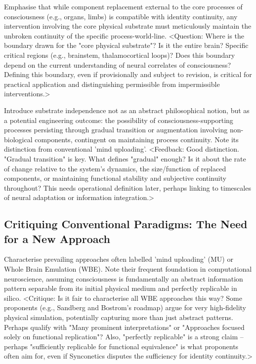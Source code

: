 \documentclass[10pt]{article}
\begin{document}
\begin{sloppypar}
  Emphasise that while component replacement external to the core processes of consciousness (e.g., organs, limbs) is compatible with identity continuity, any intervention involving the core physical substrate must meticulously maintain the unbroken continuity of the specific process-world-line. <Question: Where is the boundary drawn for the "core physical substrate"? Is it the entire brain? Specific critical regions (e.g., brainstem, thalamocortical loops)? Does this boundary depend on the current understanding of neural correlates of consciousness? Defining this boundary, even if provisionally and subject to revision, is critical for practical application and distinguishing permissible from impermissible interventions.>

  Introduce substrate independence not as an abstract philosophical notion, but as a potential engineering outcome: the possibility of consciousness-supporting processes persisting through gradual transition or augmentation involving non-biological components, contingent on maintaining process continuity. Note its distinction from conventional 'mind uploading'. <Feedback: Good distinction. "Gradual transition" is key. What defines "gradual" enough? Is it about the rate of change relative to the system's dynamics, the size/function of replaced components, or maintaining functional stability and subjective continuity throughout? This needs operational definition later, perhaps linking to timescales of neural adaptation or information integration.>

  \subsection{Critiquing Conventional Paradigms: The Need for a New Approach}
  \label{sec:new-paradigm}

  Characterise prevailing approaches often labelled 'mind uploading' (MU) or Whole Brain Emulation (WBE). Note their frequent foundation in computational neuroscience, assuming consciousness is fundamentally an abstract information pattern separable from its initial physical medium and perfectly replicable in silico. <Critique: Is it fair to characterise all WBE approaches this way? Some proponents (e.g., Sandberg and Bostrom's roadmap) argue for very high-fidelity physical simulation, potentially capturing more than just abstract patterns. Perhaps qualify with "Many prominent interpretations" or "Approaches focused solely on functional replication"? Also, "perfectly replicable" is a strong claim – perhaps "sufficiently replicable for functional equivalence" is what proponents often aim for, even if Synconetics disputes the sufficiency for identity continuity.>


\end{sloppypar}
\end{document}
